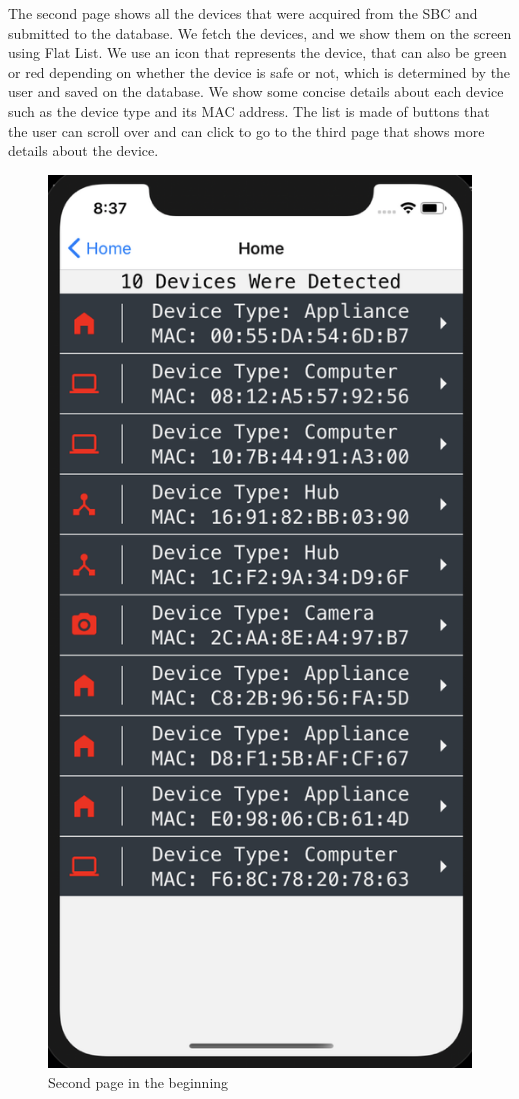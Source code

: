 \documentclass{article}
\begin{document}
The second page shows all the devices that were acquired from the SBC and submitted to the database. We fetch the devices, and we show them on the screen using Flat List. We use an icon that represents the device, that can also be green or red depending on whether the device is safe or not, which is determined by the user and saved on the database. We show some concise details about each device such as the device type and its MAC address. The list is made of buttons that the user can scroll over and can click to go to the third page that shows more details about the device.\newline

\begin{figure}[hbtp]
    \centering
    \includegraphics[scale=0.65]{frontEnd/listScreenUnsafe.png}
    \caption{Second page in the beginning} 
\end{figure}
\pagebreak
\end{document}

